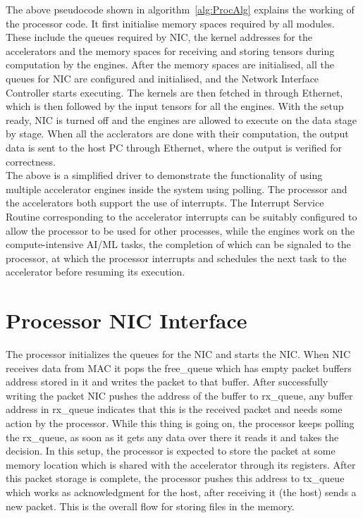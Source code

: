 \documentclass[12pt]{report}
\begin{document}
The above pseudocode shown in algorithm~\ref{alg:ProcAlg} explains the working of the processor code. It first initialise memory spaces required by all modules. These include the queues required by NIC, the kernel addresses for the accelerators and the memory spaces for receiving and storing tensors during computation by the engines. After the memory spaces are initialised, all the queues for NIC are configured and initialised, and the Network Interface Controller starts executing. The kernels are then fetched in through Ethernet, which is then followed by the input tensors for all the engines. With the setup ready, NIC is turned off and the engines are allowed to execute on the data stage by stage. When all the acclerators are done with their computation, the output data is sent to the host PC through Ethernet, where the output is verified for correctness.
\\

The above is a simplified driver to demonstrate the functionality of using multiple accelerator engines inside the system using polling. The processor and the accelerators both support the use of interrupts. The Interrupt Service Routine corresponding to the accelerator interrupts can be suitably configured to allow the processor to be used for other processes, while the engines work on the compute-intensive AI/ML tasks, the completion of which can be signaled to the processor, at which the processor interrupts and schedules the next task to the accelerator before resuming its execution.
\\


\section{Processor NIC Interface}

The processor initializes the queues for the NIC and starts the NIC. When NIC receives data from MAC it pops the free\_queue which has empty packet buffers address stored in it and writes the packet to that buffer. After successfully writing the packet NIC pushes the address of the buffer to rx\_queue, any buffer address in rx\_queue indicates that this is the received packet and needs some action by the processor. While this thing is going on, the processor keeps polling the rx\_queue, as soon as it gets any data over there it reads it and takes the decision. In this setup, the processor is expected to store the packet at some memory location which is shared with the accelerator through its registers. After this packet storage is complete, the processor pushes this address to tx\_queue which works as acknowledgment for the host, after receiving it (the host) sends a new packet. This is the overall flow for storing files in the memory.
\\
\end{document}
